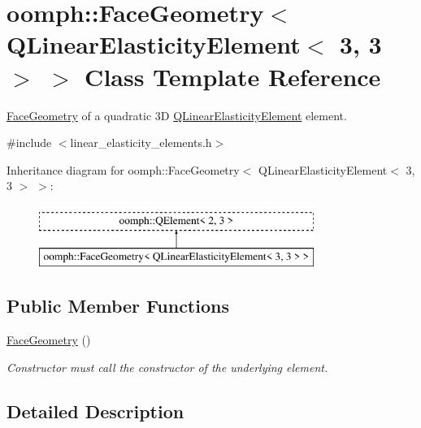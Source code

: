 \hypertarget{classoomph_1_1FaceGeometry_3_01QLinearElasticityElement_3_013_00_013_01_4_01_4}{}\section{oomph\+:\+:Face\+Geometry$<$ Q\+Linear\+Elasticity\+Element$<$ 3, 3 $>$ $>$ Class Template Reference}
\label{classoomph_1_1FaceGeometry_3_01QLinearElasticityElement_3_013_00_013_01_4_01_4}


\hyperlink{classoomph_1_1FaceGeometry}{Face\+Geometry} of a quadratic 3D \hyperlink{classoomph_1_1QLinearElasticityElement}{Q\+Linear\+Elasticity\+Element} element.  




{\ttfamily \#include $<$linear\+\_\+elasticity\+\_\+elements.\+h$>$}

Inheritance diagram for oomph\+:\+:Face\+Geometry$<$ Q\+Linear\+Elasticity\+Element$<$ 3, 3 $>$ $>$\+:\begin{figure}[H]
\begin{center}
\leavevmode
\includegraphics[height=2.000000cm]{classoomph_1_1FaceGeometry_3_01QLinearElasticityElement_3_013_00_013_01_4_01_4}
\end{center}
\end{figure}
\subsection*{Public Member Functions}
\begin{DoxyCompactItemize}
\item 
\hyperlink{classoomph_1_1FaceGeometry_3_01QLinearElasticityElement_3_013_00_013_01_4_01_4_aa2ddda4b4afce106d71f4f55a2d5ad12}{Face\+Geometry} ()
\begin{DoxyCompactList}\small\item\em Constructor must call the constructor of the underlying element. \end{DoxyCompactList}\end{DoxyCompactItemize}


\subsection{Detailed Description}
